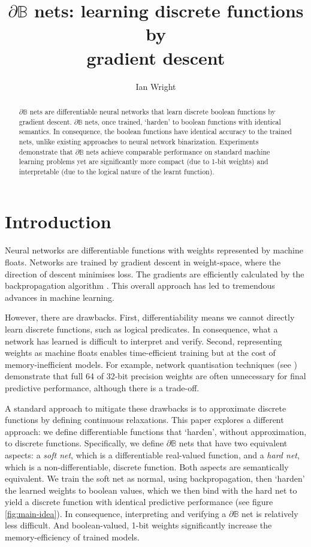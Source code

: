 \documentclass{article} %
\title{$\partial\mathbb{B}$ nets: learning discrete functions by\\gradient descent}
\author{Ian Wright}
\begin{document}
\maketitle

\begin{abstract}
	$\partial\mathbb{B}$ nets are differentiable neural networks that learn discrete boolean functions by gradient descent. $\partial\mathbb{B}$ nets, once trained, `harden' to boolean functions with identical semantics. In consequence, the boolean functions have identical accuracy to the trained nets, unlike existing approaches to neural network binarization. Experiments demonstrate that $\partial\mathbb{B}$ nets achieve comparable performance on standard machine learning problems yet are significantly more compact (due to 1-bit weights) and interpretable (due to the logical nature of the learnt function).
\end{abstract}

\section{Introduction}

Neural networks are differentiable functions with weights represented by machine floats. Networks are trained by gradient descent in weight-space, where the direction of descent minimises loss. The gradients are efficiently calculated by the backpropagation algorithm \citep{rumelhart1986learning}. This overall approach has led to tremendous advances in machine learning.

However, there are drawbacks. First, differentiability means we cannot directly learn discrete functions, such as logical predicates. In consequence, what a network has learned is difficult to interpret and verify. Second, representing weights as machine floats enables time-efficient training but at the cost of memory-inefficient models. For example, network quantisation techniques (see \cite{QIN2020107281}) demonstrate that full 64 of 32-bit precision weights are often unnecessary for final predictive performance, although there is a trade-off.

A standard approach to mitigate these drawbacks is to approximate discrete functions by defining continuous relaxations. This paper explores a different approach: we define differentiable functions that `harden', without approximation, to discrete functions. Specifically, we define $\partial \mathbb{B}$ nets that have two equivalent aspects: a {\em soft net}, which is a differentiable real-valued function, and a {\em hard net}, which is a non-differentiable, discrete function. Both aspects are semantically equivalent. We train the soft net as normal, using backpropagation, then `harden' the learned weights to boolean values, which we then bind with the hard net to yield a discrete function with identical predictive performance (see figure \ref{fig:main-idea}). In consequence, interpreting and verifying a $\partial \mathbb{B}$ net is relatively less difficult. And boolean-valued, 1-bit weights significantly increase the memory-efficiency of trained models.
\end{document}
